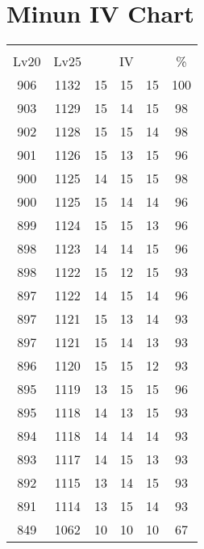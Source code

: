 \documentclass{article}%
\begin{document}
%
\normalsize%
\section{Minun IV Chart}%
\label{sec:Minun IV Chart}%
\renewcommand{\arraystretch}{1.5}%
\begin{tabular}{|c|c|c|c|c|c|}%
\hline%
\multicolumn{6}{|c|}{\textcolor{white}{ 
\linebreak{Minun}
}%
\cellcolor{black}}\\%
\multicolumn{1}{|c}{Lv20}&\multicolumn{1}{c|}{Lv25}&\multicolumn{3}{c|}{IV}&\multicolumn{1}{|c|}{\%}\\%
\hline%
\rowcolor{color100}%
906&1132&15&15&15&100\\%
\hline%
\rowcolor{color98}%
903&1129&15&14&15&98\\%
\hline%
\rowcolor{color98}%
902&1128&15&15&14&98\\%
\hline%
\rowcolor{color96}%
901&1126&15&13&15&96\\%
\hline%
\rowcolor{color98}%
900&1125&14&15&15&98\\%
\hline%
\rowcolor{color96}%
900&1125&15&14&14&96\\%
\hline%
\rowcolor{color96}%
899&1124&15&15&13&96\\%
\hline%
\rowcolor{color96}%
898&1123&14&14&15&96\\%
\hline%
\rowcolor{color93}%
898&1122&15&12&15&93\\%
\hline%
\rowcolor{color96}%
897&1122&14&15&14&96\\%
\hline%
\rowcolor{color93}%
897&1121&15&13&14&93\\%
\hline%
\rowcolor{color93}%
897&1121&15&14&13&93\\%
\hline%
\rowcolor{color93}%
896&1120&15&15&12&93\\%
\hline%
\rowcolor{color96}%
895&1119&13&15&15&96\\%
\hline%
\rowcolor{color93}%
895&1118&14&13&15&93\\%
\hline%
\rowcolor{color93}%
894&1118&14&14&14&93\\%
\hline%
\rowcolor{color93}%
893&1117&14&15&13&93\\%
\hline%
\rowcolor{color93}%
892&1115&13&14&15&93\\%
\hline%
\rowcolor{color93}%
891&1114&13&15&14&93\\%
\hline%
\rowcolor{color91}%
849&1062&10&10&10&67\\%
\end{tabular}

%
\end{document}

